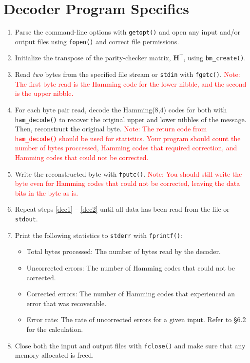\documentclass[11pt]{article}
\begin{document}
\section{Decoder Program Specifics}
  \begin{enumerate}
    \item Parse the command-line options with \texttt{getopt()} and open
      any input and/or output files using \texttt{fopen()} and correct
      file permissions.

    \item Initialize the transpose of the parity-checker matrix,
      $\boldsymbol{H}^\intercal$, using \texttt{bm\_create()}.

    \item Read \emph{two} bytes from the specified file stream or
      \texttt{stdin} with \texttt{fgetc()}. \label{dec1}
      \textcolor{red}{Note: The first byte read is the Hamming code for
      the lower nibble, and the second is the upper nibble.} \item For
      each byte pair read, decode the Hamming(8,4) codes for both with
      \texttt{ham\_decode()} to recover the original upper and lower
      nibbles of the message. Then, reconstruct the original byte.
      \textcolor{red}{Note: The return code from \texttt{ham\_decode()}
        should be used for statistics. Your program should count the
      number of bytes proccessed, Hamming codes that required
    correction, and Hamming codes that could not be corrected.}

    \item Write the reconstructed byte with \texttt{fputc()}.
      \textcolor{red}{Note: You should still write the byte even for
      Hamming codes that could not be corrected, leaving the data bits
    in the byte as is.} \label{dec2}

    \item Repeat steps \ref{dec1} -- \ref{dec2} until all data has been
      read from the file or \texttt{stdout}.

    \item Print the following statistics to \texttt{stderr} with \texttt{fprintf()}:

    \begin{itemize}
        \item Total bytes processed: The number of bytes read by the
          decoder.
        \item Uncorrected errors: The number of Hamming codes that could
          not be corrected.
        \item Corrected errors: The number of Hamming codes that
          experienced an error that was recoverable.
        \item Error rate: The rate of uncorrected errors for a given
          input. Refer to \S 6.2 for the calculation.
    \end{itemize}
    \item Close both the input and output files with \texttt{fclose()}
      and make sure that any memory allocated is freed.
\end{enumerate}
\end{document}
